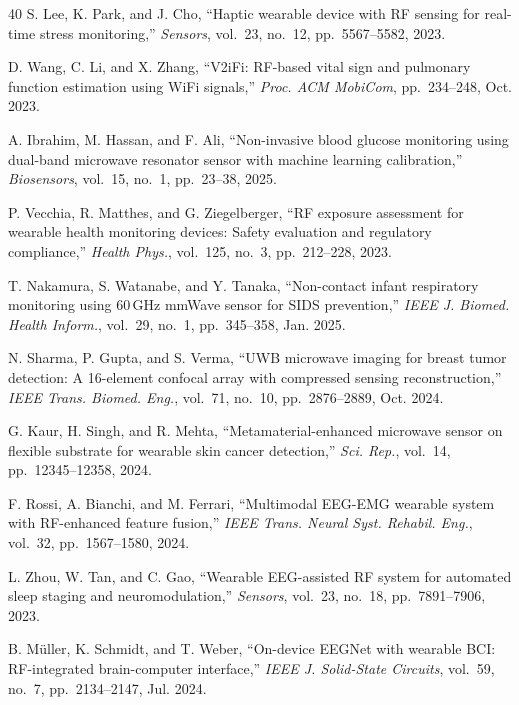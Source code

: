 \documentclass[journal,twoside]{IEEEtran}
\begin{document}
\begin{thebibliography}{40}
S. Lee, K. Park, and J. Cho, ``Haptic wearable device with RF sensing for real-time stress monitoring,'' \textit{Sensors}, vol.~23, no.~12, pp.~5567--5582, 2023.

D. Wang, C. Li, and X. Zhang, ``V2iFi: RF-based vital sign and pulmonary function estimation using WiFi signals,'' \textit{Proc. ACM MobiCom}, pp.~234--248, Oct. 2023.

A. Ibrahim, M. Hassan, and F. Ali, ``Non-invasive blood glucose monitoring using dual-band microwave resonator sensor with machine learning calibration,'' \textit{Biosensors}, vol.~15, no.~1, pp.~23--38, 2025.

P. Vecchia, R. Matthes, and G. Ziegelberger, ``RF exposure assessment for wearable health monitoring devices: Safety evaluation and regulatory compliance,'' \textit{Health Phys.}, vol.~125, no.~3, pp.~212--228, 2023.

T. Nakamura, S. Watanabe, and Y. Tanaka, ``Non-contact infant respiratory monitoring using 60\,GHz mmWave sensor for SIDS prevention,'' \textit{IEEE J. Biomed. Health Inform.}, vol.~29, no.~1, pp.~345--358, Jan. 2025.

N. Sharma, P. Gupta, and S. Verma, ``UWB microwave imaging for breast tumor detection: A 16-element confocal array with compressed sensing reconstruction,'' \textit{IEEE Trans. Biomed. Eng.}, vol.~71, no.~10, pp.~2876--2889, Oct. 2024.

G. Kaur, H. Singh, and R. Mehta, ``Metamaterial-enhanced microwave sensor on flexible substrate for wearable skin cancer detection,'' \textit{Sci. Rep.}, vol.~14, pp.~12345--12358, 2024.

F. Rossi, A. Bianchi, and M. Ferrari, ``Multimodal EEG-EMG wearable system with RF-enhanced feature fusion,'' \textit{IEEE Trans. Neural Syst. Rehabil. Eng.}, vol.~32, pp.~1567--1580, 2024.

L. Zhou, W. Tan, and C. Gao, ``Wearable EEG-assisted RF system for automated sleep staging and neuromodulation,'' \textit{Sensors}, vol.~23, no.~18, pp.~7891--7906, 2023.

B. Müller, K. Schmidt, and T. Weber, ``On-device EEGNet with wearable BCI: RF-integrated brain-computer interface,'' \textit{IEEE J. Solid-State Circuits}, vol.~59, no.~7, pp.~2134--2147, Jul. 2024.


\end{thebibliography}
\end{document}
